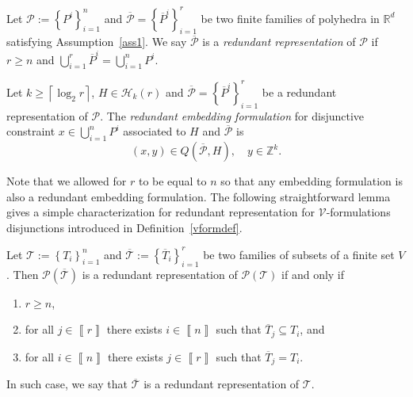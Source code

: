\documentclass[mnsc]{informs3}
\newcommand{\set}[1]{\left\{#1\right\}}                     %
\newcommand{\bra}[1]{\left(#1\right)}
\newcommand{\sidx}[1]{\left\llbracket     #1 \right\rrbracket}
\newcommand{\Real}{\mathbb R}
\begin{document}
\begin{definition}\label{redundantdef}
Let $\mathcal{P}:=\set{P^i}_{i=1}^n$ and $\overline{\mathcal{P}}=\set{\overline{P}^i}_{i=1}^r$ be two finite families of polyhedra in $\Real^d$ satisfying Assumption~\ref{ass1}. We say $\overline{\mathcal{P}}$ is a \emph{redundant representation} of $\mathcal{P}$ if $r\geq n$
 and $\bigcup_{i=1}^r \overline{P}^i=\bigcup_{i=1}^n P^i$.  

Let $k\geq \left\lceil \log_2 r\right\rceil$, $H\in \mathcal{H}_k(r)$ and $\overline{\mathcal{P}}=\set{\overline{P}^i}_{i=1}^r$  be a redundant representation of $\mathcal{P}$. The \emph{redundant embedding formulation} for disjunctive constraint $x\in \bigcup_{i=1}^n P^i$ associated to $H$ and $\overline{\mathcal{P}}$ is 
 \[ \bra{x,y}\in Q\bra{\overline{\mathcal{P}},H},\quad y\in \mathbb{Z}^k.\] 
\end{definition}

Note that we allowed for $r$ to be equal to $n$ so that any embedding formulation is also a redundant embedding formulation. The following straightforward lemma gives a simple characterization for redundant representation for $\mathcal{V}$-formulations disjunctions introduced in Definition~\ref{vformdef}.
\begin{lemma} Let $\mathcal{T}:=\set{T_i}_{i=1}^n$ and $\overline{\mathcal{T}}:=\set{\overline{T}_i}_{i=1}^r$  be two families of subsets of a finite set $V$. Then $\mathcal{P}\bra{\overline{\mathcal{T}}}$ is a redundant representation of $\mathcal{P}\bra{\mathcal{T}}$ if and only if 
\begin{enumerate}
\item $r\geq n$,
\item for all $j \in \sidx{r}$ there exists $i\in \sidx{n}$ such that $\overline{T}_j\subseteq T_i$, and
\item for all $i\in \sidx{n}$ there exists $j \in \sidx{r}$ such that $\overline{T}_j=T_i$.
\end{enumerate}
In such case, we say that $\overline{\mathcal{T}}$ is a redundant representation of $\mathcal{T}$.
\end{lemma}
\end{document}
